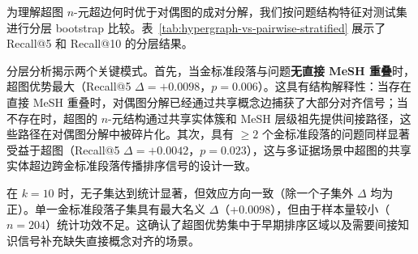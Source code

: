 为理解超图 $n$-元超边何时优于对偶图的成对分解，我们按问题结构特征对测试集进行分层 bootstrap 比较。表~\ref{tab:hypergraph-vs-pairwise-stratified} 展示了 Recall@5 和 Recall@10 的分层结果。



分层分析揭示两个关键模式。首先，当金标准段落与问题\textbf{无直接 MeSH 重叠}时，超图优势最大（Recall@5 $\Delta=+0.0098$，$p=0.006$）。这具有结构解释性：当存在直接 MeSH 重叠时，对偶图分解已经通过共享概念边捕获了大部分对齐信号；当不存在时，超图的 $n$-元结构通过共享实体簇和 MeSH 层级祖先提供间接路径，这些路径在对偶图分解中被碎片化。其次，具有 $\geq 2$ 个金标准段落的问题同样显著受益于超图（Recall@5 $\Delta=+0.0042$，$p=0.023$），这与多证据场景中超图的共享实体超边跨金标准段落传播排序信号的设计一致。

在 $k=10$ 时，无子集达到统计显著，但效应方向一致（除一个子集外 $\Delta$ 均为正）。单一金标准段落子集具有最大名义 $\Delta$（+0.0098），但由于样本量较小（$n=204$）统计功效不足。这确认了超图优势集中于早期排序区域以及需要间接知识信号补充缺失直接概念对齐的场景。
